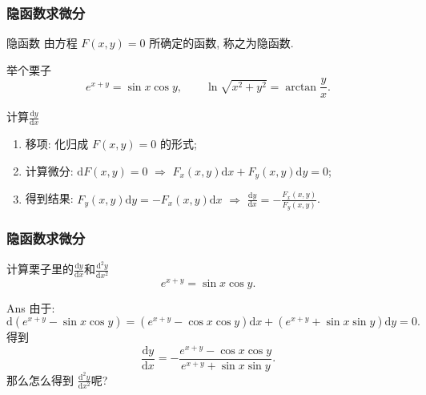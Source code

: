 \documentclass[
10pt,
aspectratio=43,
]{beamer}
\begin{document}
\begin{frame}
	\frametitle{隐函数求微分}
	\everymath{\displaystyle}
	\begin{block}{隐函数}
		由方程 $F(x, y)=0$ 所确定的函数, 称之为隐函数.
	\end{block}
	\begin{exampleblock}{举个栗子}
		$$
			e^{x+y}=\sin x\cos y,\qquad \ln \sqrt{x^2+y^2}=\arctan \frac{y}{x}.
		$$
	\end{exampleblock}
	\begin{block}{计算$\frac{\mathrm{d}y}{\mathrm{d}x}$}
		\begin{enumerate}
			\item 移项: 化归成 $F(x, y)=0$ 的形式;
			\item 计算微分: $\mathrm{d}F(x,y)=0\,\,\Rightarrow\,\,F_x(x,y)\mathrm{d}x+F_y(x,y)\mathrm{d}y=0$;
			\item 得到结果: $F_y(x,y)\mathrm{d}y=-F_x(x,y)\mathrm{d}x\,\,\Rightarrow\,\,\frac{\mathrm{d}y}{\mathrm{d}x}=-\frac{F_x(x,y)}{F_y(x,y)}$.
		\end{enumerate}
	\end{block}
\end{frame}

\begin{frame}
	\frametitle{隐函数求微分}
	\everymath{\displaystyle}
	\begin{exampleblock}{计算栗子里的$\frac{\mathrm{d}y}{\mathrm{d}x}$和$\frac{\mathrm{d}^2y}{\mathrm{d}x^2}$}
		$$
			e^{x+y}=\sin x\cos y.
		$$
	\end{exampleblock}
	\begin{block}{Ans}
		由于:
		$$
			\mathrm{d}\left(e^{x+y}-\sin x\cos y\right)=\left(e^{x+y}-\cos x\cos y\right)\mathrm{d}x+\left(e^{x+y}+\sin x\sin y\right)\mathrm{d}y=0.
		$$
		得到
		$$
			\frac{\mathrm{d}y}{\mathrm{d}x}=-\frac{e^{x+y}-\cos x\cos y}{e^{x+y}+\sin x\sin y}.
		$$
		那么怎么得到 $\frac{\mathrm{d}^2y}{\mathrm{d}x^2}$呢?
	\end{block}
\end{frame}
\end{document}
